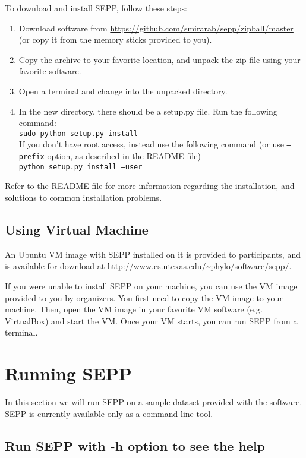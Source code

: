 \documentclass[11pt]{article} %
\newcommand{\sepp}{SEPP\xspace}
\newcommand{\ins}[1]{{\tt #1}}
\newcommand{\file}[1]{{\sf #1}}
\begin{document}
To download and install \sepp, follow these steps:

\begin{enumerate}
\item Download software from \url{https://github.com/smirarab/sepp/zipball/master} (or copy it from the memory sticks provided to you). 
\item Copy the archive to your favorite location, and unpack the zip file using your favorite software. 
\item Open a terminal and change into the unpacked directory. 
\item In the new directory, there should be a \file{setup.py} file. Run the following command:\\

\ins{sudo python setup.py install}\\

If you don't have root access, instead use the following command (or use \ins{--prefix} option, as described in the \file{README} file)\\

\ins{python setup.py install --user}

\end{enumerate}
Refer to the README file for more information regarding the installation, and solutions to common installation problems. 

\subsection{Using Virtual Machine}
An Ubuntu VM image with \sepp installed on it is provided to participants, and is available for download at \url{http://www.cs.utexas.edu/~phylo/software/sepp/}.  

If you were unable to install \sepp on your machine, you can use the VM image provided to you by organizers. You first need to copy the VM image to your machine. Then, open the VM image in your favorite VM software (e.g. VirtualBox) and start the VM. Once your VM starts, you can run \sepp from a terminal.

\section{Running \sepp}
In this section we will run \sepp on a sample dataset provided with the software. \sepp is currently available only as a command line tool. 

\subsection{Run \sepp with -h option to see the help}
\end{document}

